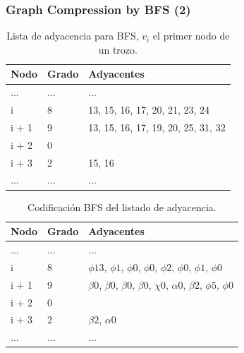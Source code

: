 \begin{frame}
\frametitle{Graph Compression by BFS (2)}

 \begin{table}%
\caption{Lista de adyacencia para BFS, $v_{i}$ el primer nodo de un trozo.}
\centering
\scriptsize

\begin{tabular}{|l|l|l|}
	\toprule
	Nodo & Grado & Adyacentes \\
	\midrule
	... & ... & ... \\
	i & 8 & 13, 15, 16, 17, 20, 21, 23, 24 \\
	i + 1 & 9 & 13, 15, 16, 17, 19, 20, 25, 31, 32 \\
	i + 2 & 0 &  \\
	i + 3 & 2 & 15, 16 \\
	... & ... & ... \\
\end{tabular}
\end{table} 

\begin{table}%
\caption{Codificación BFS del listado de adyacencia.}
\centering
\scriptsize

\begin{tabular}{|l|l|l|}
	\toprule
	Nodo & Grado & Adyacentes \\
	\midrule
	... & ... & ... \\
	i & 8 & $\phi13$, $\phi1$, $\phi0$, $\phi0$, $\phi2$, $\phi0$, $\phi1$, $\phi0$ \\
	i + 1 & 9 & $\beta0$, $\beta0$, $\beta0$, $\beta0$, $\chi0$, $\alpha0$, $\beta2$, $\phi5$, $\phi0$ \\
	i + 2 & 0 &  \\
	i + 3 & 2 & $\beta2$, $\alpha0$ \\
	... & ... & ... \\
\end{tabular}
\end{table} 

\end{frame}

